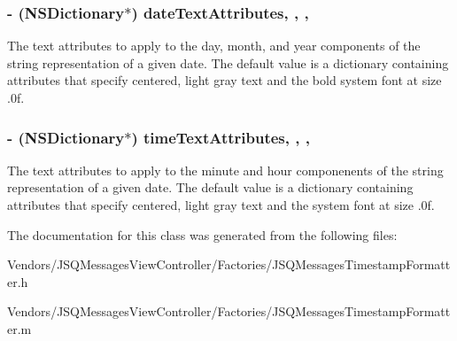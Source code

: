 \subsubsection[{date\+Text\+Attributes}]{\setlength{\rightskip}{0pt plus 5cm}-\/ (N\+S\+Dictionary$\ast$) date\+Text\+Attributes\hspace{0.3cm}{\ttfamily [read]}, {\ttfamily [write]}, {\ttfamily [nonatomic]}, {\ttfamily [copy]}}\label{interface_j_s_q_messages_timestamp_formatter_aa46961577bcd6315f416672ce37e68b5}
The text attributes to apply to the day, month, and year components of the string representation of a given date. The default value is a dictionary containing attributes that specify centered, light gray text and the bold system font at size {.\+0f}. \hypertarget{interface_j_s_q_messages_timestamp_formatter_ac2b998b66fc0eee9ed67a5efb835b0ee}{}
\subsubsection[{time\+Text\+Attributes}]{\setlength{\rightskip}{0pt plus 5cm}-\/ (N\+S\+Dictionary$\ast$) time\+Text\+Attributes\hspace{0.3cm}{\ttfamily [read]}, {\ttfamily [write]}, {\ttfamily [nonatomic]}, {\ttfamily [copy]}}\label{interface_j_s_q_messages_timestamp_formatter_ac2b998b66fc0eee9ed67a5efb835b0ee}
The text attributes to apply to the minute and hour componenents of the string representation of a given date. The default value is a dictionary containing attributes that specify centered, light gray text and the system font at size {.\+0f}. 

The documentation for this class was generated from the following files\+:\begin{DoxyCompactItemize}
\item 
Vendors/\+J\+S\+Q\+Messages\+View\+Controller/\+Factories/J\+S\+Q\+Messages\+Timestamp\+Formatter.\+h\item 
Vendors/\+J\+S\+Q\+Messages\+View\+Controller/\+Factories/J\+S\+Q\+Messages\+Timestamp\+Formatter.\+m\end{DoxyCompactItemize}
